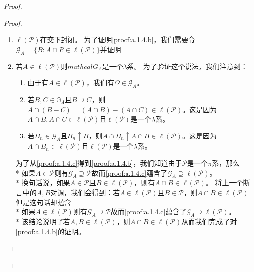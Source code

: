 \documentclass[main.tex]{subfiles}
\begin{document}
\begin{proof}
\begin{proof}
\begin{enumerate}[label=(\alph*)]
			为了证明\ref{proof:a.1.4.a}，我们需要知道如果一个\(\pi\)系在交下是封闭的，那么它就是一个\(\sigma\)域。
			由于
			\[\begin{split}
				&A\in \mathcal{L}\Rightarrow A^c = \Omega-A \in \mathcal{L}\\
				&A\cup B = (A^c\cap B^c)^c\\
				&\text{若}n\rightarrow +\infty \text{则}\bigcup_{i=1}^n A_i \uparrow \bigcup_{i=1}^{+\infty} A_i
			\end{split}\]
			至此，我们就可以说明
			\item\label{proof:a.1.4.b} \(\ell(\mathcal{P})\)在交下封闭。
			为了证明\ref{proof:a.1.4.b}，我们需要令\(\mathcal{G}_A = \{B: A\cap B \in \ell(\mathcal{P})\}\)并证明
			\item\label{proof:a.1.4.c} 若\(A \in \ell(\mathcal{P})\)则\(mathcal{G}_A\)是一个\(\lambda\)系。
			为了验证这个说法，我们注意到：\begin{enumerate}
				\item 由于有\(A \in \ell(\mathcal{P})\)，我们有\(\Omega \in \mathcal{G}_A\)。
				\item 若\(B,C \in \mathbb{G}_A\)且\(B \supseteq C\)，则\(A\cap(B-C) = (A\cap B) - (A\cap C) \in \ell(\mathcal{P})\)。这是因为\(A\cap B, A\cap C \in \ell(\mathcal{P})\)且\(\ell(\mathcal{P})\)是一个\(\lambda\)系。
				\item 若\(B_n \in \mathcal{G}_A\)且\(B_n \uparrow B\)，则\(A\cap B_n \uparrow A\cap B \in \ell(\mathcal{P})\)。这是因为\(A\cap B_n \in \ell(\mathcal{P})\)且\(\ell(\mathcal{P})\)是一个\(\lambda\)系。
			\end{enumerate}
			为了从\ref{proof:a.1.4.c}得到\ref{proof:a.1.4.b}，我们知道由于\(\mathcal{P}\)是一个\(\pi\)系，那么\\*
			如果\(A\in \mathcal{P}\)则有\(\mathcal{G}_A \supseteq \mathcal{P}\)故而\ref{proof:a.1.4.c}蕴含了\(\mathcal{G}_A \supseteq \ell(\mathcal{P})\)。\\*
			换句话说，如果\(A\in \mathcal{P}\)且\(B\in\ell(\mathcal{P})\)，则有\(A\cap B \in \ell(\mathcal{P})\)。
			将上一个断言中的\(A,B\)对调，我们会得到：若\(A\in \ell(\mathcal{P})\)且\(B\in \mathcal{P}\)，则\(A \cap B \in \ell(\mathcal{P})\)但是这句话却蕴含\\*
			如果\(A\in \ell(\mathcal{P})\)则有\(\mathcal{G}_A \supseteq \mathcal{P}\)故而\ref{proof:a.1.4.c}蕴含了\(\mathcal{G}_A \supseteq \ell(\mathcal{P})\)。\\*
			该结论说明了若\(A,B\in\ell(\mathcal{P})\)，则\(A\cap B \in \ell(\mathcal{P})\)从而我们完成了对\ref{proof:a.1.4.b}的证明。

\end{enumerate}
\end{proof}
\end{proof}
\end{document}
